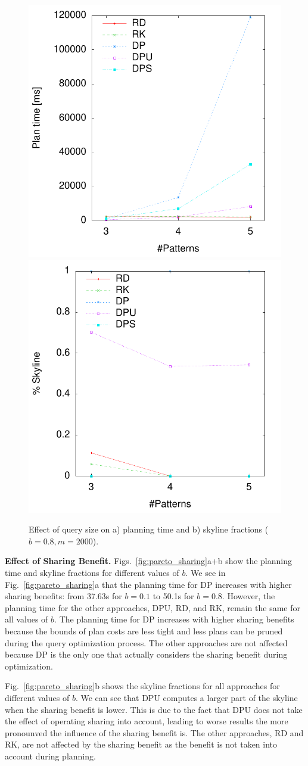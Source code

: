 \begin{figure}[htb]
  \centering
  \includegraphics[width=0.49\linewidth]{figs/pareto_plan_tp.pdf}
  \includegraphics[width=0.49\linewidth]{figs/plans_skyline_by_tp.pdf}
  \caption{Effect of query size on a) planning time and b) skyline
    fractions ($b=0.8, m=2000$).}
  \label{fig:pareto_tp}
\end{figure}

\textbf{Effect of Sharing Benefit.} Figs.~\ref{fig:pareto_sharing}a+b
show the planning time and skyline fractions for different values of
$b$. We see in Fig.~\ref{fig:pareto_sharing}a that the planning time
for DP increases with higher sharing benefits: from 37.63s for $b=0.1$
to 50.1s for $b=0.8$. However, the planning time for the other
approaches, DPU, RD, and RK, remain the same for all values of
$b$. The planning time for DP increases with higher sharing benefits
because the bounds of plan costs are less tight and less plans can be
pruned during the query optimization process. The other approaches are
not affected because DP is the only one that actually considers the
sharing benefit during optimization.

Fig.~\ref{fig:pareto_sharing}b shows the skyline fractions for all
approaches for different values of $b$. We can see that DPU computes a
larger part of the skyline when the sharing benefit is lower. This is
due to the fact that DPU does not take the effect of operating sharing
into account, leading to worse results the more pronounved the
influence of the sharing benefit is. The other approaches, RD and RK,
are not affected by the sharing benefit as the benefit is not taken
into account during planning.


